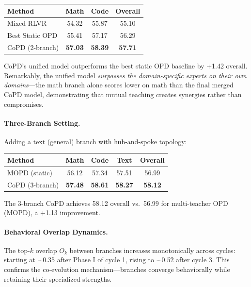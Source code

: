 \documentclass[11pt]{article}
\begin{document}
\begin{center}
\begin{tabular}{lccc}
\toprule
\textbf{Method} & \textbf{Math} & \textbf{Code} & \textbf{Overall} \\
\midrule
Mixed RLVR & 54.32 & 55.87 & 55.10 \\
Best Static OPD & 55.41 & 57.17 & 56.29 \\
CoPD (2-branch) & \textbf{57.03} & \textbf{58.39} & \textbf{57.71} \\
\bottomrule
\end{tabular}
\end{center}

CoPD's unified model outperforms the best static OPD baseline by +1.42 overall. Remarkably, the unified model \emph{surpasses the domain-specific experts on their own domains}---the math branch alone scores lower on math than the final merged CoPD model, demonstrating that mutual teaching creates synergies rather than compromises.

\paragraph{Three-Branch Setting.}
Adding a text (general) branch with hub-and-spoke topology:

\begin{center}
\begin{tabular}{lcccc}
\toprule
\textbf{Method} & \textbf{Math} & \textbf{Code} & \textbf{Text} & \textbf{Overall} \\
\midrule
MOPD (static) & 56.12 & 57.34 & 57.51 & 56.99 \\
CoPD (3-branch) & \textbf{57.48} & \textbf{58.61} & \textbf{58.27} & \textbf{58.12} \\
\bottomrule
\end{tabular}
\end{center}

The 3-branch CoPD achieves 58.12 overall vs.\ 56.99 for multi-teacher OPD (MOPD), a +1.13 improvement.

\paragraph{Behavioral Overlap Dynamics.}
The top-$k$ overlap $O_k$ between branches increases monotonically across cycles: starting at $\sim$0.35 after Phase I of cycle 1, rising to $\sim$0.52 after cycle 3. This confirms the co-evolution mechanism---branches converge behaviorally while retaining their specialized strengths.
\end{document}
